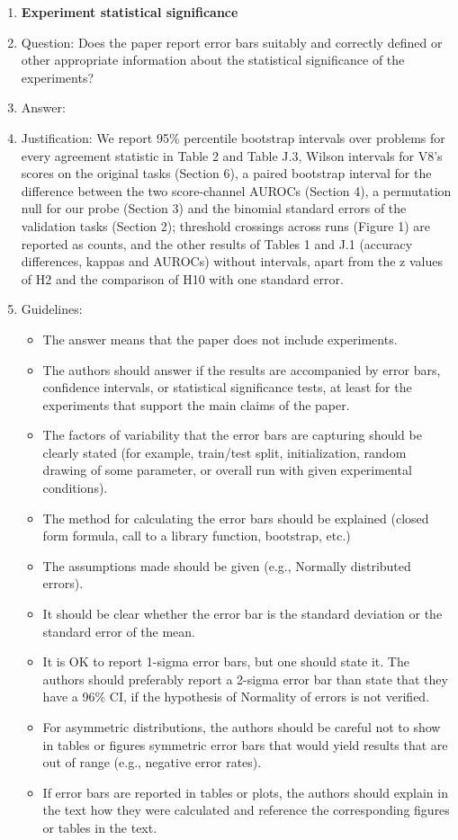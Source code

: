 \begin{enumerate}
\item {\bf Experiment statistical significance}
    \item[] Question: Does the paper report error bars suitably and correctly defined or other appropriate information about the statistical significance of the experiments?
    \item[] Answer: \answerYes{}
    \item[] Justification: We report 95\% percentile bootstrap intervals over problems for every agreement statistic in Table 2 and Table J.3, Wilson intervals for V8's scores on the original tasks (Section 6), a paired bootstrap interval for the difference between the two score-channel AUROCs (Section 4), a permutation null for our probe (Section 3) and the binomial standard errors of the validation tasks (Section 2); threshold crossings across runs (Figure 1) are reported as counts, and the other results of Tables 1 and J.1 (accuracy differences, kappas and AUROCs) without intervals, apart from the z values of H2 and the comparison of H10 with one standard error.
    \item[] Guidelines:
    \begin{itemize}
        \item The answer \answerNA{} means that the paper does not include experiments.
        \item The authors should answer \answerYes{} if the results are accompanied by error bars, confidence intervals, or statistical significance tests, at least for the experiments that support the main claims of the paper.
        \item The factors of variability that the error bars are capturing should be clearly stated (for example, train/test split, initialization, random drawing of some parameter, or overall run with given experimental conditions).
        \item The method for calculating the error bars should be explained (closed form formula, call to a library function, bootstrap, etc.)
        \item The assumptions made should be given (e.g., Normally distributed errors).
        \item It should be clear whether the error bar is the standard deviation or the standard error of the mean.
        \item It is OK to report 1-sigma error bars, but one should state it. The authors should preferably report a 2-sigma error bar than state that they have a 96\% CI, if the hypothesis of Normality of errors is not verified.
        \item For asymmetric distributions, the authors should be careful not to show in tables or figures symmetric error bars that would yield results that are out of range (e.g., negative error rates).
        \item If error bars are reported in tables or plots, the authors should explain in the text how they were calculated and reference the corresponding figures or tables in the text.
    \end{itemize}


\end{enumerate}
